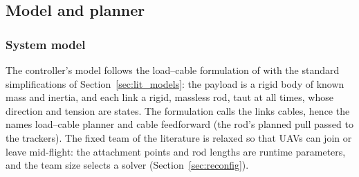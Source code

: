 
\subsection{Model and planner}
\label{sec:model}

\subsubsection{System model}

The controller's model follows the load--cable formulation of \cite{tudelft} with the standard
simplifications of Section~\ref{sec:lit_models}: the payload is a rigid body of known mass and inertia,
and each link a rigid, massless rod, taut at all times, whose direction and tension are states. The
formulation calls the links cables, hence the names load--cable planner and cable feedforward (the rod's
planned pull passed to the trackers). The fixed team of the literature
\cite{efficient, wahbaKinodynamicMotionPlanning2024, quan2025swarm} is relaxed so that UAVs can join or
leave mid-flight:
the attachment points and rod lengths are runtime parameters, and the team size selects a solver
(Section~\ref{sec:reconfig}).

